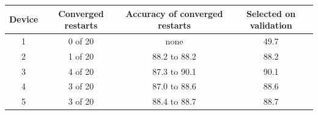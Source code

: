 \begin{tabular}{cccc}
\toprule
Device & Converged restarts & Accuracy of converged restarts & Selected on validation \\
\midrule
1 & 0 of 20 & none & 49.7 \\
2 & 1 of 20 & 88.2 to 88.2 & 88.2 \\
3 & 4 of 20 & 87.3 to 90.1 & 90.1 \\
4 & 3 of 20 & 87.0 to 88.6 & 88.6 \\
5 & 3 of 20 & 88.4 to 88.7 & 88.7 \\
\bottomrule
\end{tabular}
